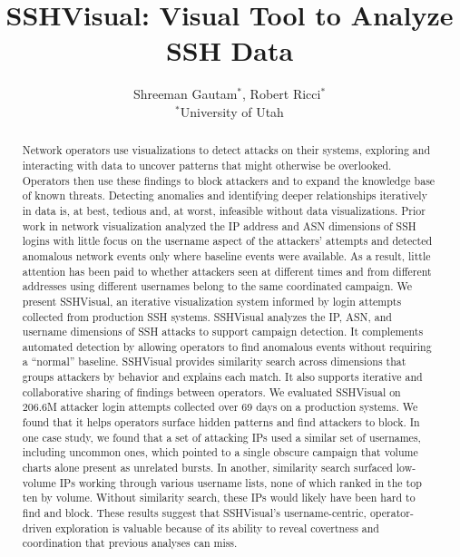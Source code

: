 \documentclass[10pt,twocolumn]{article}   %
\title{\textbf{SSHVisual: Visual Tool to Analyze SSH Data}}
\author{
    Shreeman Gautam$^*$, Robert Ricci$^*$\\
    \small $^*$University of Utah
}
\date{} %
\begin{document}
\maketitle %
\begin{abstract} 

Network operators use visualizations to detect attacks on their systems, exploring and interacting with data to uncover patterns 
that might otherwise be overlooked. Operators then use these findings to block attackers and to expand the knowledge base of known threats. Detecting
anomalies and identifying deeper relationships iteratively in data is, at best, tedious and, at worst, infeasible without data visualizations.
Prior work in network visualization analyzed the IP address and ASN dimensions of SSH logins with little focus on the username aspect of 
the attackers' attempts and detected anomalous network events only where baseline events were available. 
As a result, little attention has been paid to whether attackers seen at different times and from different
addresses using different usernames belong to the same coordinated campaign.
We present SSHVisual, an iterative visualization system informed by login attempts collected from production SSH systems. SSHVisual analyzes the IP, ASN, and 
username dimensions 
of SSH attacks to support campaign detection. It complements automated detection by allowing operators to find anomalous events 
without requiring a ``normal'' baseline. 
SSHVisual provides similarity search across dimensions that groups
attackers by behavior and explains each match. It also supports iterative and collaborative sharing of findings between operators.
We evaluated SSHVisual on 206.6M attacker login attempts collected over 69 days on a production systems. We found that it helps operators surface hidden patterns
and find attackers to block. In one case study, we found that a set of attacking IPs used a similar set of usernames,
including uncommon ones, which pointed to a single obscure campaign that volume charts alone present as unrelated
bursts. In another, similarity search surfaced low-volume IPs working through
various username lists, none of which ranked in the top ten by volume. Without similarity search, these IPs would likely have been hard to find and block. These results
suggest that SSHVisual's username-centric, operator-driven exploration is valuable because of its ability to reveal covertness and coordination that previous 
analyses can miss.



\end{abstract}
\end{document}
